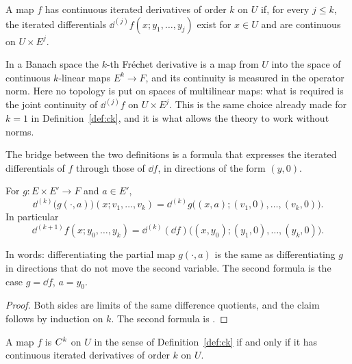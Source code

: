 \begin{definition}
  \label{def:bastiani}
  \leanok
  A map $f$ has continuous iterated derivatives of order $k$ on $U$ if, for every $j \leq k$,
  the iterated differentials $\dd^{(j)} f(x; y_1, \dots, y_j)$ exist for $x \in U$ and are
  continuous on $U \times E^j$.
\end{definition}

\begin{remark}
  In a Banach space the $k$-th Fréchet derivative is a map from $U$ into the space of
  continuous $k$-linear maps $E^k \to F$, and its continuity is measured in the operator norm.
  Here no topology is put on spaces of multilinear maps: what is required is the joint
  continuity of $\dd^{(j)} f$ on $U \times E^j$. This is the same choice already made for
  $k = 1$ in Definition~\ref{def:ck}, and it is what allows the theory to work without norms.
\end{remark}

The bridge between the two definitions is a formula that expresses the iterated differentials
of $f$ through those of $\dd f$, in directions of the form $(y, 0)$.

\begin{lemma}[Slices]
  \label{lem:slice}
  \leanok
  For $g \colon E \times E' \to F$ and $a \in E'$,
  \[
    \dd^{(k)}\bigl(g(\cdot, a)\bigr)(x; v_1, \dots, v_k)
      = \dd^{(k)} g\bigl((x, a); (v_1, 0), \dots, (v_k, 0)\bigr).
  \]
  In particular
  \[
    \dd^{(k+1)} f(x; y_0, \dots, y_k)
      = \dd^{(k)}(\dd f)\bigl((x, y_0); (y_1, 0), \dots, (y_k, 0)\bigr).
  \]
\end{lemma}

In words: differentiating the partial map $g(\cdot, a)$ is the same as differentiating $g$ in
directions that do not move the second variable. The second formula is the case $g = \dd f$,
$a = y_0$.

\begin{proof}
  \leanok
  Both sides are limits of the same difference quotients, and the claim follows by induction on
  $k$. The second formula is \cite[(1.36)]{GN26}.
\end{proof}

\begin{theorem}
  \label{thm:ck-iff-bastiani}
  \leanok
  A map $f$ is $C^{k}$ on $U$ in the sense of Definition~\ref{def:ck} if and only if it has
  continuous iterated derivatives of order $k$ on $U$.
\end{theorem}

